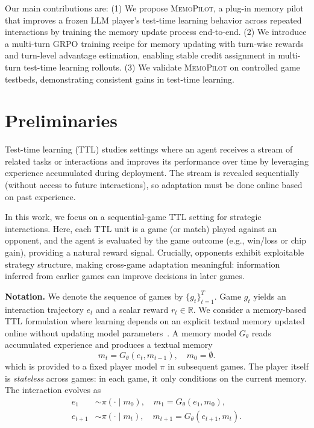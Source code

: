 \documentclass{article}
\newcommand{\methodname}{MemoPilot}
\newcommand{\method}{\textsc{\methodname}}
\theoremstyle{plain}
\theoremstyle{definition}
\theoremstyle{remark}
\begin{document}
Our main contributions are:
(1) We propose \method{}, a plug-in memory pilot that improves a frozen LLM player’s test-time learning behavior across repeated interactions by training the memory update process end-to-end.
(2) We introduce a multi-turn GRPO training recipe for memory updating with turn-wise rewards and turn-level advantage estimation, enabling stable credit assignment in multi-turn test-time learning rollouts.
(3) We validate \method{} on controlled game testbeds, demonstrating consistent gains in test-time learning.

\section{Preliminaries}
\label{sec:prelim}

Test-time learning (TTL) studies settings where an agent receives a stream of related tasks or interactions and improves its performance over time by leveraging experience accumulated during deployment. The stream is revealed sequentially (without access to future interactions), so adaptation must be done online based on past experience.

In this work, we focus on a sequential-game TTL setting for strategic interactions. Here, each TTL unit is a game (or match) played against an opponent, and the agent is evaluated by the game outcome (e.g., win/loss or chip gain), providing a natural reward signal. Crucially, opponents exhibit exploitable strategy structure, making cross-game adaptation meaningful: information inferred from earlier games can improve decisions in later games.

\textbf{Notation.}
We denote the sequence of games by $\{g_t\}_{t=1}^T$. Game $g_t$ yields an interaction trajectory $e_t$ and a scalar reward $r_t \in \mathbb{R}$. We consider a memory-based TTL formulation where learning depends on an explicit textual memory updated online without updating model parameters~\citep{suzgun2025dynamic,ouyang2026reasoningbank}. A memory model $G_\theta$ reads accumulated experience and produces a textual memory
\begin{equation}
    m_t = G_\theta(e_t, m_{t-1}), \quad m_0 = \emptyset.
    \label{eq:memory_update}
\end{equation}
which is provided to a fixed player model $\pi$ in subsequent games. The player itself is \emph{stateless} across games: in each game, it only conditions on the current memory. The interaction evolves as
\begin{equation*}
\begin{aligned}
e_1 &\sim \pi(\cdot \mid m_0), \quad m_1 = G_\theta(e_1, m_0), \\
e_{t+1} &\sim \pi(\cdot \mid m_t), \quad m_{t+1} = G_\theta(e_{t+1}, m_t).
\end{aligned}
\end{equation*}
 
\end{document}
